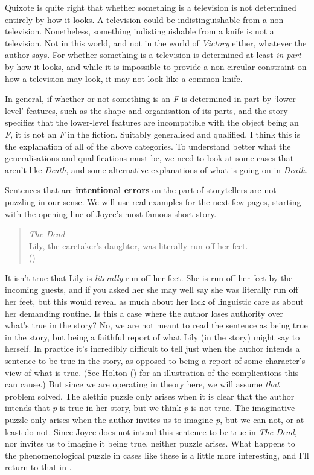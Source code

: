 \documentclass[
  11pt,
  letterpaper,
  DIV=11,
  numbers=noendperiod,
  twoside]{scrartcl}
\begin{document}
Quixote is quite right that whether something is a television is not
determined entirely by how it looks. A television could be
indistinguishable from a non-television. Nonetheless, something
indistinguishable from a knife is not a television. Not in this world,
and not in the world of \emph{Victory} either, whatever the author says.
For whether something is a television is determined at least \emph{in
part} by how it looks, and while it is impossible to provide a
non-circular constraint on how a television may look, it may not look
like a common knife.

In general, if whether or not something is an \emph{F} is determined in
part by `lower-level' features, such as the shape and organisation of
its parts, and the story specifies that the lower-level features are
incompatible with the object being an \emph{F}, it is not an \emph{F} in
the fiction. Suitably generalised and qualified, I think this is the
explanation of all of the above categories. To understand better what
the generalisations and qualifications must be, we need to look at some
cases that aren't like \emph{Death}, and some alternative explanations
of what is going on in \emph{Death}.

Sentences that are \textbf{intentional errors} on the part of
storytellers are not puzzling in our sense. We will use real examples
for the next few pages, starting with the opening line of Joyce's most
famous short story.

\begin{quote}
\emph{The Dead}\\
Lily, the caretaker's daughter, was literally run off her feet.\\
()
\end{quote}

It isn't true that Lily is \emph{literally} run off her feet. She is run
off her feet by the incoming guests, and if you asked her she may well
say she was literally run off her feet, but this would reveal as much
about her lack of linguistic care as about her demanding routine. Is
this a case where the author loses authority over what's true in the
story? No, we are not meant to read the sentence as being true in the
story, but being a faithful report of what Lily (in the story) might say
to herself. In practice it's incredibly difficult to tell just when the
author intends a sentence to be true in the story, as opposed to being a
report of some character's view of what is true. (See Holton
() for an illustration of the
complications this can cause.) But since we are operating in theory
here, we will assume \emph{that} problem solved. The alethic puzzle only
arises when it is clear that the author intends that \emph{p} is true in
her story, but we think \emph{p} is not true. The imaginative puzzle
only arises when the author invites us to imagine \emph{p}, but we can
not, or at least do not. Since Joyce does not intend this sentence to be
true in \emph{The Dead}, nor invites us to imagine it being true,
neither puzzle arises. What happens to the phenomenological puzzle in
cases like these is a little more interesting, and I'll return to that
in .
\end{document}
